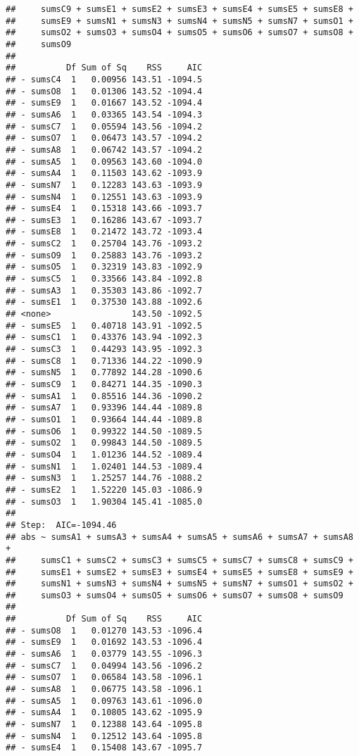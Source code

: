\documentclass[,man,floatsintext]{apa6}
\begin{document}
\begin{verbatim}
##     sumsC9 + sumsE1 + sumsE2 + sumsE3 + sumsE4 + sumsE5 + sumsE8 + 
##     sumsE9 + sumsN1 + sumsN3 + sumsN4 + sumsN5 + sumsN7 + sumsO1 + 
##     sumsO2 + sumsO3 + sumsO4 + sumsO5 + sumsO6 + sumsO7 + sumsO8 + 
##     sumsO9
## 
##          Df Sum of Sq    RSS     AIC
## - sumsC4  1   0.00956 143.51 -1094.5
## - sumsO8  1   0.01306 143.52 -1094.4
## - sumsE9  1   0.01667 143.52 -1094.4
## - sumsA6  1   0.03365 143.54 -1094.3
## - sumsC7  1   0.05594 143.56 -1094.2
## - sumsO7  1   0.06473 143.57 -1094.2
## - sumsA8  1   0.06742 143.57 -1094.2
## - sumsA5  1   0.09563 143.60 -1094.0
## - sumsA4  1   0.11503 143.62 -1093.9
## - sumsN7  1   0.12283 143.63 -1093.9
## - sumsN4  1   0.12551 143.63 -1093.9
## - sumsE4  1   0.15318 143.66 -1093.7
## - sumsE3  1   0.16286 143.67 -1093.7
## - sumsE8  1   0.21472 143.72 -1093.4
## - sumsC2  1   0.25704 143.76 -1093.2
## - sumsO9  1   0.25883 143.76 -1093.2
## - sumsO5  1   0.32319 143.83 -1092.9
## - sumsC5  1   0.33566 143.84 -1092.8
## - sumsA3  1   0.35303 143.86 -1092.7
## - sumsE1  1   0.37530 143.88 -1092.6
## <none>                143.50 -1092.5
## - sumsE5  1   0.40718 143.91 -1092.5
## - sumsC1  1   0.43376 143.94 -1092.3
## - sumsC3  1   0.44293 143.95 -1092.3
## - sumsC8  1   0.71336 144.22 -1090.9
## - sumsN5  1   0.77892 144.28 -1090.6
## - sumsC9  1   0.84271 144.35 -1090.3
## - sumsA1  1   0.85516 144.36 -1090.2
## - sumsA7  1   0.93396 144.44 -1089.8
## - sumsO1  1   0.93664 144.44 -1089.8
## - sumsO6  1   0.99322 144.50 -1089.5
## - sumsO2  1   0.99843 144.50 -1089.5
## - sumsO4  1   1.01236 144.52 -1089.4
## - sumsN1  1   1.02401 144.53 -1089.4
## - sumsN3  1   1.25257 144.76 -1088.2
## - sumsE2  1   1.52220 145.03 -1086.9
## - sumsO3  1   1.90304 145.41 -1085.0
## 
## Step:  AIC=-1094.46
## abs ~ sumsA1 + sumsA3 + sumsA4 + sumsA5 + sumsA6 + sumsA7 + sumsA8 + 
##     sumsC1 + sumsC2 + sumsC3 + sumsC5 + sumsC7 + sumsC8 + sumsC9 + 
##     sumsE1 + sumsE2 + sumsE3 + sumsE4 + sumsE5 + sumsE8 + sumsE9 + 
##     sumsN1 + sumsN3 + sumsN4 + sumsN5 + sumsN7 + sumsO1 + sumsO2 + 
##     sumsO3 + sumsO4 + sumsO5 + sumsO6 + sumsO7 + sumsO8 + sumsO9
## 
##          Df Sum of Sq    RSS     AIC
## - sumsO8  1   0.01270 143.53 -1096.4
## - sumsE9  1   0.01692 143.53 -1096.4
## - sumsA6  1   0.03779 143.55 -1096.3
## - sumsC7  1   0.04994 143.56 -1096.2
## - sumsO7  1   0.06584 143.58 -1096.1
## - sumsA8  1   0.06775 143.58 -1096.1
## - sumsA5  1   0.09763 143.61 -1096.0
## - sumsA4  1   0.10805 143.62 -1095.9
## - sumsN7  1   0.12388 143.64 -1095.8
## - sumsN4  1   0.12512 143.64 -1095.8
## - sumsE4  1   0.15408 143.67 -1095.7

\end{verbatim}
\end{document}
